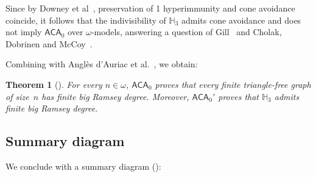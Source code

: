 \documentclass{article}
\def\HH{\mathbb{H}}
\newcommand{\ACA}[0]{\mathsf{ACA}}
\newtheorem{theorem}{Theorem}
\numberwithin{theorem}{section}
\theoremstyle{definition}
\begin{document}
Since by Downey et al~\cite{downey2022relationships}, preservation of 1 hyperimmunity and cone avoidance coincide, it follows that the indivisibility of $\HH_3$ admits cone avoidance and does not imply $\ACA_0$ over $\omega$-models, answering a question of Gill~\cite{gill2023note} and Cholak, Dobrinen and McCoy~\cite[Question 48]{cholak2026henson}.
\smallskip

Combining  with Anglès d’Auriac et al.~\cite{angles2023carlson}, we obtain:

\begin{theorem}[\cite{cholak2026hensonupper}]
For every $n \in \omega$, $\ACA_0$ proves that every finite triangle-free graph of size~$n$ has finite big Ramsey degree.
Moreover, $\ACA_0'$ proves that $\HH_3$ admits finite big Ramsey degree.
\end{theorem}

\subsection{Summary diagram}

We conclude with a summary diagram ():
\end{document}
